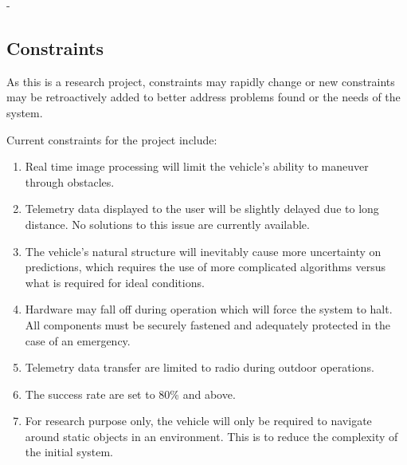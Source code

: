 -\documentclass[compsoc,draftclsnofoot,onecolumn,10pt]{IEEEtran}
\begin{document}
\subsection{Constraints} %
As this is a research project, constraints may rapidly change or new constraints may be retroactively added to better address problems found or the needs of the system. \par
Current constraints for the project include: 
\begin{enumerate}
	\item Real time image processing will limit the vehicle's ability to maneuver through obstacles. 
	\item Telemetry data displayed to the user will be slightly delayed due to long distance. 
	No solutions to this issue are currently available.
	\item The vehicle's natural structure will inevitably cause more uncertainty on predictions, which requires the use of more complicated algorithms versus what is required for ideal conditions.
	\item Hardware may fall off during operation which will force the system to halt. 
	All components must be securely fastened and adequately protected in the case of an emergency.  
	\item Telemetry data transfer are limited to radio during outdoor operations.
	\item The success rate are set to 80\% and above.
	\item For research purpose only, the vehicle will only be required to navigate around static objects in an environment. 
	This is to reduce the complexity of the initial system. 
\end{enumerate}
\end{document}
